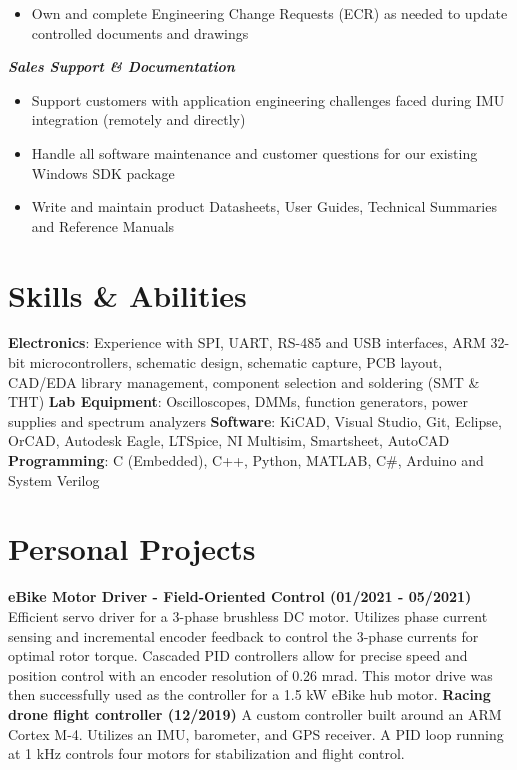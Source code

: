 \documentclass[]{article}
\begin{document}
\begin{singlespace}
\begin{itemize}
    \vspace{-1mm}
    \item Own and complete Engineering Change Requests (ECR) as needed to update controlled documents and drawings

\end{itemize}

\noindent\textbf{\emph{Sales Support \& Documentation}}
\vspace{-2mm}
\begin{itemize}
    \setlength\itemsep{0em}
    \item Support customers with application engineering challenges faced during IMU integration (remotely and directly)
    \item Handle all software maintenance and customer questions for our existing Windows SDK package 
    \item Write and maintain product Datasheets, User Guides, Technical Summaries and Reference Manuals 
\end{itemize}

\section*{Skills \& Abilities}

\textbf{Electronics}: Experience with SPI, UART, RS-485 and USB interfaces, ARM 32-bit microcontrollers, schematic design, schematic capture, PCB layout,
CAD/EDA library management, component selection and soldering (SMT \& THT)
\newline\textbf{Lab Equipment}: Oscilloscopes, DMMs, function generators, power supplies and spectrum analyzers
\newline\textbf{Software}: KiCAD, Visual Studio, Git, Eclipse, OrCAD, Autodesk Eagle, LTSpice, NI Multisim, Smartsheet, AutoCAD
\newline\textbf{Programming}: C (Embedded), C++, Python, MATLAB, C\#, Arduino and System Verilog


\section*{Personal Projects}


\textbf{eBike Motor Driver - Field-Oriented Control (01/2021 - 05/2021)}\newline
Efficient servo driver for a 3-phase brushless DC motor.
Utilizes phase current sensing and incremental encoder feedback to control the 3-phase currents for optimal rotor torque.
Cascaded PID controllers allow for precise speed and position control with an encoder resolution of 0.26 mrad.\newline
This motor drive was then successfully used as the controller for a 1.5 kW eBike hub motor.
\vspace{-2mm}\newline\newline
\textbf{Racing drone flight controller (12/2019)}\newline
A custom controller built around an ARM Cortex M-4. Utilizes an IMU, barometer, and GPS receiver. A PID loop
running at 1 kHz controls four motors for stabilization and flight control.



\end{singlespace}
\end{document}
